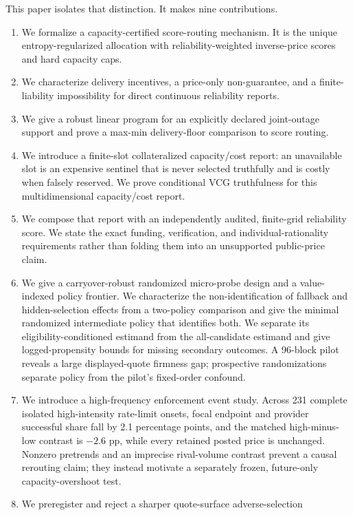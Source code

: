 \documentclass[11pt]{article}
\theoremstyle{definition}
\begin{document}
This paper isolates that distinction. It makes nine contributions.
\begin{enumerate}
  \item We formalize a capacity-certified score-routing mechanism. It is the
  unique entropy-regularized allocation with reliability-weighted
  inverse-price scores and hard capacity caps.
  \item We characterize delivery incentives, a price-only non-guarantee, and
  a finite-liability impossibility for direct continuous reliability reports.
  \item We give a robust linear program for an explicitly declared joint-outage
  support and prove a max-min delivery-floor comparison to score routing.
  \item We introduce a finite-slot collateralized capacity/cost report: an
  unavailable slot is an expensive sentinel that is never selected truthfully
  and is costly when falsely reserved. We prove conditional VCG truthfulness
  for this multidimensional capacity/cost report.
  \item We compose that report with an independently audited, finite-grid
  reliability score. We state the exact funding, verification, and
  individual-rationality requirements rather than folding them into an
  unsupported public-price claim.
  \item We give a carryover-robust randomized micro-probe design and a
  value-indexed policy frontier. We characterize the non-identification of
  fallback and hidden-selection effects from a two-policy comparison and give
  the minimal randomized intermediate policy that identifies both. We separate
  its eligibility-conditioned estimand from the all-candidate estimand and give
  logged-propensity bounds for missing secondary outcomes. A 96-block pilot
  reveals a large displayed-quote firmness gap; prospective randomizations
  separate policy from the pilot's fixed-order confound.
  \item We introduce a high-frequency enforcement event study. Across 231
  complete isolated high-intensity rate-limit onsets, focal endpoint and
  provider successful share fall by 2.1 percentage points, and the matched
  high-minus-low contrast is $-2.6$ pp, while every retained posted price is
  unchanged. Nonzero pretrends and an imprecise rival-volume contrast prevent a
  causal rerouting claim; they instead motivate a separately frozen,
  future-only capacity-overshoot test.
  \item We preregister and reject a sharper quote-surface adverse-selection

\end{enumerate}
\end{document}
